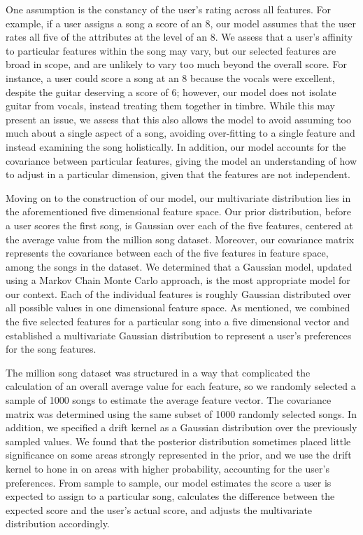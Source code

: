 \documentclass{amsart}
\theoremstyle{plain}
\theoremstyle{definition}
\begin{document}
  	One assumption is the constancy of the user's rating across all features. For example, if a user assigns a song a score of an 8, our model assumes that the user rates all five of the attributes at the level of an 8. We assess that a user's affinity to particular features within the song may vary, but our selected features are broad in scope, and are unlikely to vary too much beyond the overall score. For instance, a user could score a song at an 8 because the vocals were excellent, despite the guitar deserving a score of 6; however, our model does not isolate guitar from vocals, instead treating them together in timbre. While this may present an issue, we assess that this also allows the model to avoid assuming too much about a single aspect of a song, avoiding over-fitting to a single feature and instead examining the song holistically. In addition, our model accounts for the covariance between particular features, giving the model an understanding of how to adjust in a particular dimension, given that the features are not independent. 
  	
  	Moving on to the construction of our model, our multivariate distribution lies in the aforementioned five dimensional feature space. Our prior distribution, before a user scores the first song, is Gaussian over each of the five features, centered at the average value from the million song dataset. Moreover, our covariance matrix represents the covariance between each of the five features in feature space, among the songs in the dataset. We determined that a Gaussian model, updated using a Markov Chain Monte Carlo approach, is the most appropriate model for our context. Each of the individual features is roughly Gaussian distributed over all possible values in one dimensional feature space. As mentioned, we combined the five selected features for a particular song into a five dimensional vector and established a multivariate Gaussian distribution to represent a user's preferences for the song features.
  	
  	The million song dataset was structured in a way that complicated the calculation of an overall average value for each feature, so we randomly selected a sample of 1000 songs to estimate the average feature vector. The covariance matrix was determined using the same subset of 1000 randomly selected songs. In addition, we specified a drift kernel as a Gaussian distribution over the previously sampled values. We found that the posterior distribution sometimes placed little significance on some areas strongly represented in the prior, and we use the drift kernel to hone in on areas with higher probability, accounting for the user's preferences. From sample to sample, our model estimates the score a user is expected to assign to a particular song, calculates the difference between the expected score and the user's actual score, and adjusts the multivariate distribution accordingly.
  	
\end{document}
